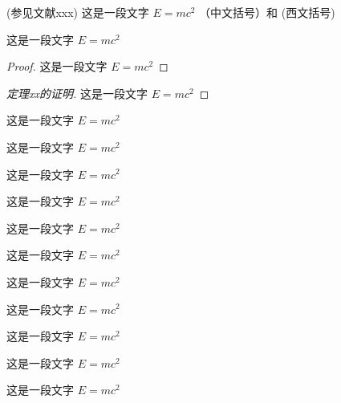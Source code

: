 \documentclass[type = master]{whu-thesis}
\begin{document}
\begin{definition}[测度]
  (参见文献xxx) 这是一段文字 $E = m c^2$  （中文括号）和 (西文括号)
\end{definition}

\begin{theorem}
  这是一段文字 $E = m c^2$
\end{theorem}


\begin{proof}
  这是一段文字 $E = m c^2$
\end{proof}

\begin{proof}[定理xx的证明]
  这是一段文字 $E = m c^2$
\end{proof}

\begin{example}
  这是一段文字 $E = m c^2$
\end{example}

\begin{property}
  这是一段文字 $E = m c^2$
\end{property}

\begin{proposition}
  这是一段文字 $E = m c^2$
\end{proposition}

\begin{corollary}
  这是一段文字 $E = m c^2$
\end{corollary}

\begin{lemma}
  这是一段文字 $E = m c^2$
\end{lemma}

\begin{axiom}
  这是一段文字 $E = m c^2$
\end{axiom}

\begin{counterexample}
  这是一段文字 $E = m c^2$
\end{counterexample}

\begin{conjecture}
  这是一段文字 $E = m c^2$
\end{conjecture}

\begin{question}
  这是一段文字 $E = m c^2$
\end{question}

\begin{claim}
  这是一段文字 $E = m c^2$
\end{claim}

\begin{remark}
  这是一段文字 $E = m c^2$
\end{remark}
\end{document}
